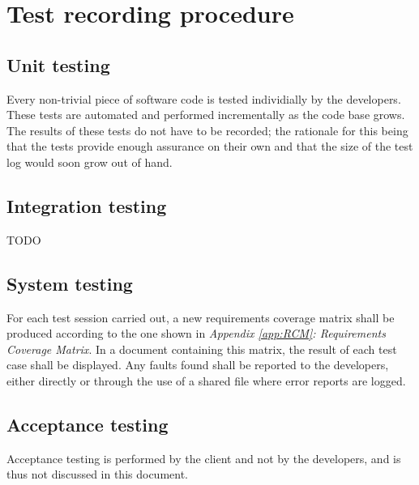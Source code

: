 \documentclass[12pt,titlepage]{article}
\begin{document}

\section{Test recording procedure}
\label{sec:test-recording-procedure}

\subsection{Unit testing}
\label{subsec:test-recording-procedure-unit-testing}

Every non-trivial piece of software code is tested individially by the
developers. These tests are automated and performed incrementally as the
code base grows. The results of these tests do not have to be recorded; the
rationale for this being that the tests provide enough assurance on their own
and that the size of the test log would soon grow out of hand.

\subsection{Integration testing}
\label{subsec:test-recording-procedure-integration-testing}

TODO \\

\subsection{System testing}
\label{subsec:test-recording-procedure-system-testing}

For each test session carried out, a new requirements coverage matrix shall be
produced according to the one shown in \textit{Appendix \ref{app:RCM}:
Requirements Coverage Matrix}. In a document containing this matrix, the result
of each test case shall be displayed. Any faults found shall be reported to the
developers, either directly or through the use of a shared file where error
reports are logged.

\subsection{Acceptance testing}
\label{subsec:test-recording-procedure-acceptance-testing}

Acceptance testing is performed by the client and not by the developers, and is
thus not discussed in this document.
\end{document}
